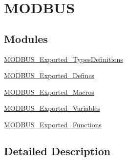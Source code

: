 \hypertarget{group___m_o_d_b_u_s}{}\section{M\+O\+D\+B\+US}
\label{group___m_o_d_b_u_s}
\subsection*{Modules}
\begin{DoxyCompactItemize}
\item 
\mbox{\hyperlink{group___m_o_d_b_u_s___exported___types_definitions}{M\+O\+D\+B\+U\+S\+\_\+\+Exported\+\_\+\+Types\+Definitions}}
\item 
\mbox{\hyperlink{group___m_o_d_b_u_s___exported___defines}{M\+O\+D\+B\+U\+S\+\_\+\+Exported\+\_\+\+Defines}}
\item 
\mbox{\hyperlink{group___m_o_d_b_u_s___exported___macros}{M\+O\+D\+B\+U\+S\+\_\+\+Exported\+\_\+\+Macros}}
\item 
\mbox{\hyperlink{group___m_o_d_b_u_s___exported___variables}{M\+O\+D\+B\+U\+S\+\_\+\+Exported\+\_\+\+Variables}}
\item 
\mbox{\hyperlink{group___m_o_d_b_u_s___exported___functions}{M\+O\+D\+B\+U\+S\+\_\+\+Exported\+\_\+\+Functions}}
\end{DoxyCompactItemize}


\subsection{Detailed Description}
